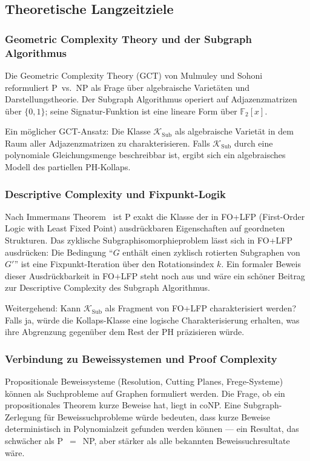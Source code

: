 ﻿\documentclass[a4paper,12pt]{article}
\theoremstyle{definition}
\begin{document}
\subsection{Theoretische Langzeitziele}

\subsubsection{Geometric Complexity Theory und der Subgraph Algorithmus}

Die Geometric Complexity Theory (GCT) von Mulmuley und Sohoni~\cite{mulmuley2001gct}
reformuliert P~vs.~NP als Frage über algebraische Varietäten und Darstellungstheorie.
Der Subgraph Algorithmus operiert auf Adjazenzmatrizen über $\{0,1\}$;
seine Signatur-Funktion ist eine lineare Form über $\mathbb{F}_2[x]$.

Ein möglicher GCT-Ansatz: Die Klasse $\mathcal{K}_\mathrm{Sub}$ als algebraische
Varietät in dem Raum aller Adjazenzmatrizen zu charakterisieren.
Falls $\mathcal{K}_\mathrm{Sub}$ durch eine polynomiale Gleichungsmenge beschreibbar
ist, ergibt sich ein algebraisches Modell des partiellen PH-Kollaps.

\subsubsection{Descriptive Complexity und Fixpunkt-Logik}

Nach Immermans Theorem~\cite{immerman1999descriptive} ist P exakt die Klasse
der in FO+LFP (First-Order Logic with Least Fixed Point) ausdrückbaren
Eigenschaften auf geordneten Strukturen.
Das zyklische Subgraphisomorphieproblem lässt sich in FO+LFP ausdrücken:
Die Bedingung ``$G$ enthält einen zyklisch rotierten Subgraphen von $G'$''
ist eine Fixpunkt-Iteration über den Rotationsindex $k$.
Ein formaler Beweis dieser Ausdrückbarkeit in FO+LFP steht noch aus und wäre
ein schöner Beitrag zur Descriptive Complexity des Subgraph Algorithmus.

Weitergehend: Kann $\mathcal{K}_\mathrm{Sub}$ als Fragment von FO+LFP charakterisiert
werden? Falls ja, würde die Kollaps-Klasse eine logische Charakterisierung erhalten,
was ihre Abgrenzung gegenüber dem Rest der PH präzisieren würde.

\subsubsection{Verbindung zu Beweissystemen und Proof Complexity}

Propositionale Beweissysteme (Resolution, Cutting Planes, Frege-Systeme)
können als Suchprobleme auf Graphen formuliert werden.
Die Frage, ob ein propositionales Theorem kurze Beweise hat, liegt in coNP.
Eine Subgraph-Zerlegung für Beweissuchprobleme würde bedeuten, dass kurze Beweise
deterministisch in Polynomialzeit gefunden werden können --- ein Resultat,
das schwächer als P~$=$~NP, aber stärker als alle bekannten Beweissuchresultate wäre.
\end{document}
